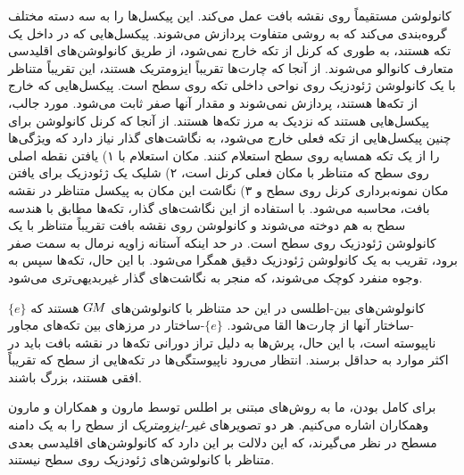 کانولوشن مستقیماً روی نقشه بافت عمل می‌کند.
این پیکسل‌ها را به سه دسته مختلف گروه‌بندی می‌کند که به روشی متفاوت پردازش می‌شوند.
پیکسل‌هایی که در داخل یک تکه هستند، به طوری که کرنل از تکه خارج نمی‌شود، از طریق کانولوشن‌های اقلیدسی متعارف کانوالو می‌شوند.
از آنجا که چارت‌ها تقریباً ایزومتریک هستند، این تقریباً متناظر با یک کانولوشن ژئودزیک روی نواحی داخلی تکه روی سطح است.
پیکسل‌هایی که خارج از تکه‌ها هستند، پردازش نمی‌شوند و مقدار آنها صفر ثابت می‌شود.
مورد جالب، پیکسل‌هایی هستند که نزدیک به مرز تکه‌ها هستند.
از آنجا که کرنل کانولوشن برای چنین پیکسل‌هایی از تکه فعلی خارج می‌شود، به نگاشت‌های گذار نیاز دارد که ویژگی‌ها را از یک تکه همسایه روی سطح استعلام کنند.
مکان استعلام با
۱) یافتن نقطه اصلی روی سطح که متناظر با مکان فعلی کرنل است،
۲) شلیک یک ژئودزیک برای یافتن مکان نمونه‌برداری کرنل روی سطح و
۳) نگاشت این مکان به پیکسل متناظر در نقشه بافت، محاسبه می‌شود.
با استفاده از این نگاشت‌های گذار، تکه‌ها مطابق با هندسه سطح به هم دوخته می‌شوند و کانولوشن روی نقشه بافت تقریباً متناظر با یک کانولوشن ژئودزیک روی سطح است.
در حد اینکه آستانه زاویه نرمال به سمت صفر برود، تقریب به یک کانولوشن ژئودزیک دقیق همگرا می‌شود.
با این حال، تکه‌ها سپس به وجوه منفرد کوچک می‌شوند، که منجر به نگاشت‌های گذار غیربدیهی‌تری می‌شود.

کانولوشن‌های بین-اطلسی در این حد متناظر با کانولوشن‌های $G\mkern-1.4muM$ هستند که $\{e\}$-ساختار آنها از چارت‌ها القا می‌شود.
$\{e\}$-ساختار در مرزهای بین تکه‌های مجاور ناپیوسته است، با این حال، پرش‌ها به دلیل تراز دورانی تکه‌ها در نقشه بافت باید در اکثر موارد به حداقل برسند.
انتظار می‌رود ناپیوستگی‌ها در تکه‌هایی از سطح که تقریباً افقی هستند، بزرگ باشند.

برای کامل بودن، ما به روش‌های مبتنی بر اطلس توسط مارون و همکاران\cite{sinha2016deep} و مارون وهمکاران\cite{maron2017convolutional} اشاره می‌کنیم.
هر دو تصویرهای \emph{غیر-ایزومتریک} از سطح را به یک دامنه مسطح در نظر می‌گیرند، که این دلالت بر این دارد که کانولوشن‌های اقلیدسی بعدی متناظر با کانولوشن‌های ژئودزیک روی سطح نیستند.